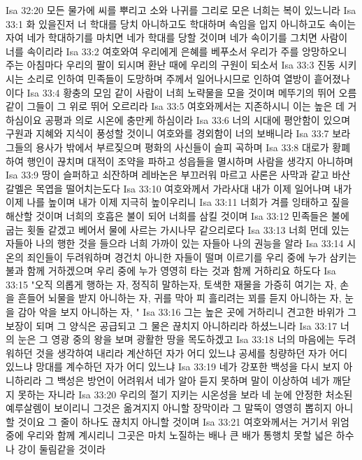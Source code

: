 Isa 32:20  모든 물가에 씨를 뿌리고 소와 나귀를 그리로 모은 너희는 복이 있느니라
Isa 33:1  화 있을진저 너 학대를 당치 아니하고도 학대하며 속임을 입지 아니하고도 속이는 자여 네가 학대하기를 마치면 네가 학대를 당할 것이며 네가 속이기를 그치면 사람이 너를 속이리라
Isa 33:2  여호와여 우리에게 은혜를 베푸소서 우리가 주를 앙망하오니 주는 아침마다 우리의 팔이 되시며 환난 때에 우리의 구원이 되소서
Isa 33:3  진동 시키시는 소리로 인하여 민족들이 도망하며 주께서 일어나시므로 인하여 열방이 흩어졌나이다
Isa 33:4  황충의 모임 같이 사람이 너희 노략물을 모을 것이며 메뚜기의 뛰어 오름같이 그들이 그 위로 뛰어 오르리라
Isa 33:5  여호와께서는 지존하시니 이는 높은 데 거하심이요 공평과 의로 시온에 충만케 하심이라
Isa 33:6  너의 시대에 평안함이 있으며 구원과 지혜와 지식이 풍성할 것이니 여호와를 경외함이 너의 보배니라
Isa 33:7  보라 그들의 용사가 밖에서 부르짖으며 평화의 사신들이 슬피 곡하며
Isa 33:8  대로가 황폐하여 행인이 끊치며 대적이 조약을 파하고 성읍들을 멸시하며 사람을 생각지 아니하며
Isa 33:9  땅이 슬퍼하고 쇠잔하며 레바논은 부끄러워 마르고 사론은 사막과 같고 바산 갈멜은 목엽을 떨어치는도다
Isa 33:10  여호와께서 가라사대 내가 이제 일어나며 내가 이제 나를 높이며 내가 이제 지극히 높이우리니
Isa 33:11  너희가 겨를 잉태하고 짚을 해산할 것이며 너희의 호흡은 불이 되어 너희를 삼킬 것이며
Isa 33:12  민족들은 불에 굽는 횟돌 같겠고 베어서 물에 사르는 가시나무 같으리로다
Isa 33:13  너희 먼데 있는 자들아 나의 행한 것을 들으라 너희 가까이 있는 자들아 나의 권능을 알라
Isa 33:14  시온의 죄인들이 두려워하며 경건치 아니한 자들이 떨며 이르기를 우리 중에 누가 삼키는 불과 함께 거하겠으며 우리 중에 누가 영영히 타는 것과 함께 거하리요 하도다
Isa 33:15  "오직 의롭게 행하는 자, 정직히 말하는자, 토색한 재물을 가증히 여기는 자, 손을 흔들어 뇌물을 받지 아니하는 자, 귀를 막아 피 흘리려는 꾀를 듣지 아니하는 자, 눈을 감아 악을 보지 아니하는 자, "
Isa 33:16  그는 높은 곳에 거하리니 견고한 바위가 그 보장이 되며 그 양식은 공급되고 그 물은 끊치지 아니하리라 하셨느니라
Isa 33:17  너의 눈은 그 영광 중의 왕을 보며 광활한 땅을 목도하겠고
Isa 33:18  너의 마음에는 두려워하던 것을 생각하여 내리라 계산하던 자가 어디 있느냐 공세를 칭량하던 자가 어디 있느냐 망대를 계수하던 자가 어디 있느냐
Isa 33:19  네가 강포한 백성을 다시 보지 아니하리라 그 백성은 방언이 어려워서 네가 알아 듣지 못하며 말이 이상하여 네가 깨닫지 못하는 자니라
Isa 33:20  우리의 절기 지키는 시온성을 보라 네 눈에 안정한 처소된 예루살렘이 보이리니 그것은 옮겨지지 아니할 장막이라 그 말뚝이 영영히 뽑히지 아니할 것이요 그 줄이 하나도 끊치지 아니할 것이며
Isa 33:21  여호와께서는 거기서 위엄 중에 우리와 함께 계시리니 그곳은 마치 노질하는 배나 큰 배가 통행치 못할 넓은 하수나 강이 둘림같을 것이라
